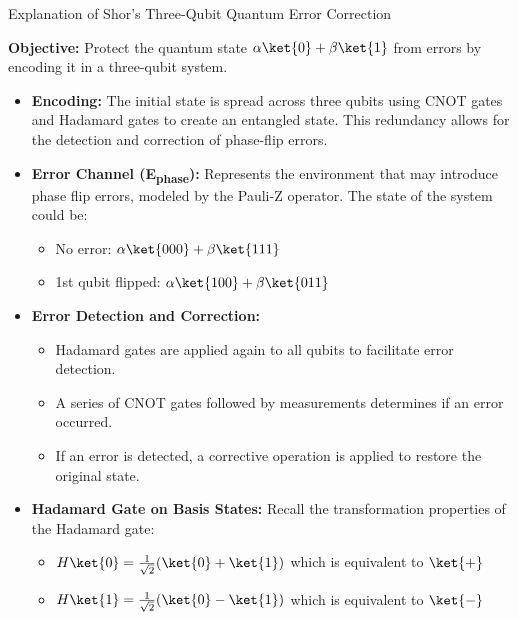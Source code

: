 \begin{frame}{Explanation of Shor's Three-Qubit Quantum Error Correction}

\textbf{Objective:} Protect the quantum state \(\alpha\ket{0} + \beta\ket{1}\) from errors by encoding it in a three-qubit system.

\begin{itemize}
    \item \textbf{Encoding:} The initial state is spread across three qubits using CNOT gates and Hadamard gates to create an entangled state. This redundancy allows for the detection and correction of phase-flip errors.
    
    \item \textbf{Error Channel (E\textsubscript{phase}):} Represents the environment that may introduce phase flip errors, modeled by the Pauli-Z operator. The state of the system could be:
    \begin{itemize}
        \item No error: \(\alpha\ket{000} + \beta\ket{111}\)
        \item 1st qubit flipped: \(\alpha\ket{100} + \beta\ket{011}\)
    \end{itemize}
    
    \item \textbf{Error Detection and Correction:} 
    \begin{itemize}
        \item Hadamard gates are applied again to all qubits to facilitate error detection.
        \item A series of CNOT gates followed by measurements determines if an error occurred.
        \item If an error is detected, a corrective operation is applied to restore the original state.
    \end{itemize}
    
    \item \textbf{Hadamard Gate on Basis States:} Recall the transformation properties of the Hadamard gate:
    \begin{itemize}
        \item \(H \ket{0} = \frac{1}{\sqrt{2}}(\ket{0} + \ket{1})\) which is equivalent to \(\ket{+}\)
        \item \(H \ket{1} = \frac{1}{\sqrt{2}}(\ket{0} - \ket{1})\) which is equivalent to \(\ket{-}\)
    \end{itemize}
\end{itemize}

\end{frame}






